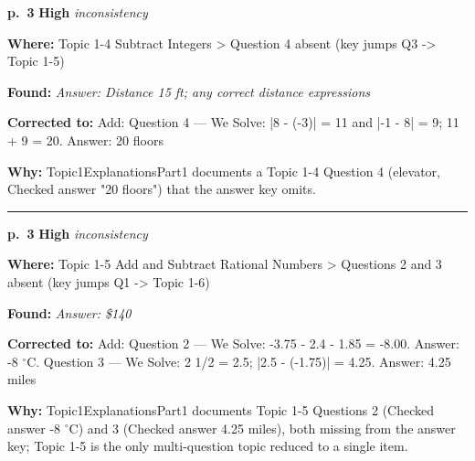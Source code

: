 \documentclass[11pt]{article}
\newcommand{\sevhigh}[1]{\textcolor{red!75!black}{\textbf{#1}}}
\begin{document}
\noindent\textbf{p.~3} \quad \sevhigh{High} \quad \textit{inconsistency}\par
\noindent\textbf{Where: }Topic 1-4 Subtract Integers > Question 4 absent (key jumps Q3 -> Topic 1-5)\par
\noindent\textbf{Found: }\textit{Answer: Distance 15 ft; any correct distance expressions}\par
\noindent\textbf{Corrected to: }Add: Question 4 --- We Solve: |8 - (-3)| = 11 and |-1 - 8| = 9; 11 + 9 = 20. Answer: 20 floors\par
\noindent\textbf{Why: }Topic1ExplanationsPart1 documents a Topic 1-4 Question 4 (elevator, Checked answer "20 floors") that the answer key omits.\par\vspace{4pt}
\noindent\rule{\textwidth}{0.4pt}\par\nobreak\vspace{2pt}
\noindent\textbf{p.~3} \quad \sevhigh{High} \quad \textit{inconsistency}\par
\noindent\textbf{Where: }Topic 1-5 Add and Subtract Rational Numbers > Questions 2 and 3 absent (key jumps Q1 -> Topic 1-6)\par
\noindent\textbf{Found: }\textit{Answer: \$140}\par
\noindent\textbf{Corrected to: }Add: Question 2 --- We Solve: -3.75 - 2.4 - 1.85 = -8.00. Answer: -8 $^\circ$C. Question 3 --- We Solve: 2 1/2 = 2.5; |2.5 - (-1.75)| = 4.25. Answer: 4.25 miles\par
\noindent\textbf{Why: }Topic1ExplanationsPart1 documents Topic 1-5 Questions 2 (Checked answer -8 $^\circ$C) and 3 (Checked answer 4.25 miles), both missing from the answer key; Topic 1-5 is the only multi-question topic reduced to a single item.\par\vspace{4pt}
\end{document}
